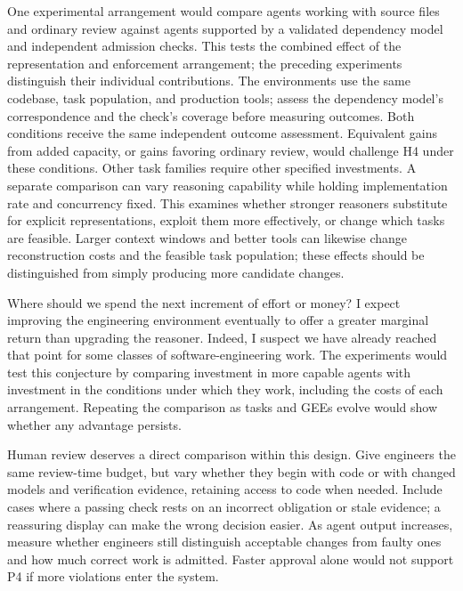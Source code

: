 One experimental arrangement would compare agents working with source files and ordinary review against agents supported by a validated dependency model and independent admission checks. This tests the combined effect of the representation and enforcement arrangement; the preceding experiments distinguish their individual contributions. The environments use the same codebase, task population, and production tools; assess the dependency model's correspondence and the check's coverage before measuring outcomes. Both conditions receive the same independent outcome assessment. Equivalent gains from added capacity, or gains favoring ordinary review, would challenge H4 under these conditions. Other task families require other specified investments. A separate comparison can vary reasoning capability while holding implementation rate and concurrency fixed. This examines whether stronger reasoners substitute for explicit representations, exploit them more effectively, or change which tasks are feasible. Larger context windows and better tools can likewise change reconstruction costs and the feasible task population; these effects should be distinguished from simply producing more candidate changes.


Where should we spend the next increment of effort or money? I expect improving the engineering environment eventually to offer a greater marginal return than upgrading the reasoner. Indeed, I suspect we have already reached that point for some classes of software-engineering work. The experiments would test this conjecture by comparing investment in more capable agents with investment in the conditions under which they work, including the costs of each arrangement. Repeating the comparison as tasks and GEEs evolve would show whether any advantage persists.


Human review deserves a direct comparison within this design. Give engineers the same review-time budget, but vary whether they begin with code or with changed models and verification evidence, retaining access to code when needed. Include cases where a passing check rests on an incorrect obligation or stale evidence; a reassuring display can make the wrong decision easier. As agent output increases, measure whether engineers still distinguish acceptable changes from faulty ones and how much correct work is admitted. Faster approval alone would not support P4 if more violations enter the system.

